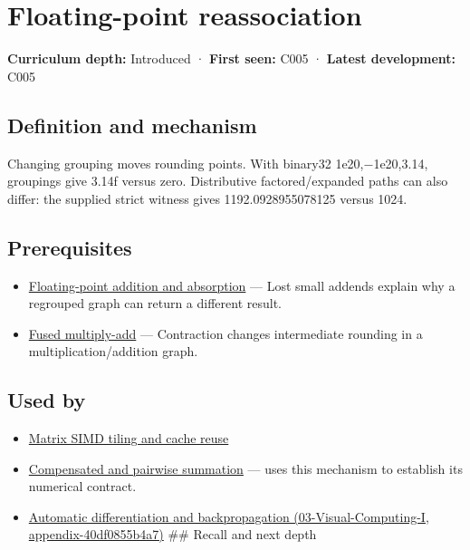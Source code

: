 \hypertarget{appendix-c2ac4a84c283}{}
\section{Floating-point reassociation}\label{appendix-c2ac4a84c283-floating-point-reassociation}

\textbf{Curriculum depth:} Introduced · \textbf{First seen:} C005 · \textbf{Latest development:} C005

\subsection{Definition and mechanism}\label{appendix-c2ac4a84c283-definition-and-mechanism}

Changing grouping moves rounding points. With binary32 1e20,−1e20,3.14, groupings give 3.14f versus zero. Distributive factored/expanded paths can also differ: the supplied strict witness gives 1192.0928955078125 versus 1024.

\subsection{Prerequisites}\label{appendix-c2ac4a84c283-prerequisites}

\begin{itemize}
\tightlist
\item
  \hyperref[appendix-a1b1b4580dfd]{Floating-point addition and absorption} --- Lost small addends explain why a regrouped graph can return a different result.
\item
  \hyperref[appendix-41e8ef22a21e]{Fused multiply-add} --- Contraction changes intermediate rounding in a multiplication/addition graph.
\end{itemize}

\subsection{Used by}\label{appendix-c2ac4a84c283-used-by}

\begin{itemize}
\item
  \hyperref[appendix-1bfb7c657105]{Matrix SIMD tiling and cache reuse}
\item
  \hyperref[appendix-df318da57389]{Compensated and pairwise summation} --- uses this mechanism to establish its numerical contract.
\item
  \href{../03-Visual-Computing-I/main.pdf\#nameddest=appendix-40df0855b4a7}{Automatic differentiation and backpropagation (03-Visual-Computing-I, appendix-40df0855b4a7)} \#\# Recall and next depth
\end{itemize}

